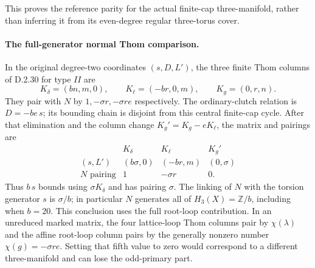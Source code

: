 This proves the reference parity for the actual finite-cap
three-manifold, rather than inferring it from its even-degree
regular three-torus cover.

\paragraph{The full-generator normal Thom comparison.}
In the original degree-two coordinates $(s,D,L')$, the three
finite Thom columns of D.2.30 for type $II$ are
\[
 K_\delta=(bn,m,0),\qquad
 K_\ell=(-br,0,m),\qquad K_g=(0,r,n).
 \tag{D.FN7}
\]
They pair with $N$ by $1,-\sigma r,-\sigma re$ respectively.
The ordinary-clutch relation is $D=-be\,s$; its bounding
chain is disjoint from this central finite-cap cycle.
After that elimination and the column change
$K_g'=K_g-eK_\ell$, the matrix and pairings are
\[
 \begin{array}{c|ccc}
       &K_\delta&K_\ell&K_g'\\ \hline
 (s,L')&(b\sigma,0)&(-br,m)&(0,\sigma)\\
 N\text{ pairing}&1&-\sigma r&0 .
 \end{array}
 \tag{D.FN8}
\]
Thus $b\,s$ bounds using $\sigma K_\delta$ and has pairing
$\sigma$.  The linking of $N$ with the torsion generator
$s$ is $\sigma/b$; in particular $N$ generates all of
$H_3(X)=\mathbb Z/b$, including when $b=20$.
This conclusion uses the full root-loop contribution.  In an
unreduced marked matrix, the four lattice-loop Thom columns
pair by $\chi(\lambda)$ and the affine root-loop column pairs
by the generally nonzero number $\chi(g)=-\sigma re$.
Setting that fifth value to zero would correspond to a
different three-manifold and can lose the odd-primary part.
